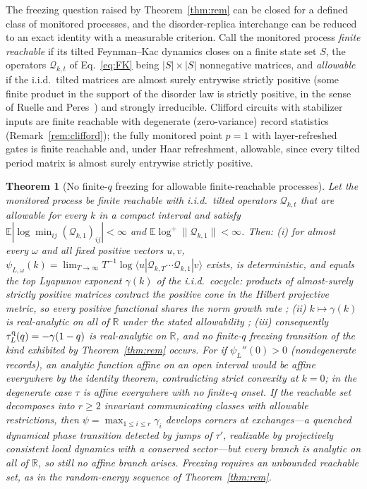 \documentclass[aps,prx,reprint,superscriptaddress,nobibnotes,longbibliography]{revtex4-2}
\newtheorem{theorem}{Theorem}
\theoremstyle{remark}
\newcommand{\E}{\mathbb E}
\begin{document}
The freezing question raised by Theorem~\ref{thm:rem} can be closed for a
defined class of monitored processes, and the disorder-replica interchange
can be reduced to an exact identity with a measurable criterion.  Call the
monitored process \emph{finite reachable} if its tilted Feynman--Kac
dynamics closes on a finite state set $S$, the operators
$\mathcal Q_{k,t}$ of Eq.~\eqref{eq:FK} being $|S|\times|S|$ nonnegative
matrices, and \emph{allowable} if the i.i.d.\ tilted matrices are almost
surely entrywise strictly positive (some finite product in the support of
the disorder law is strictly positive, in the sense of Ruelle and
Peres~\cite{Ruelle1979,Peres1992}) and strongly irreducible.  Clifford
circuits with stabilizer inputs are finite reachable with degenerate
(zero-variance) record statistics (Remark~\ref{rem:clifford}); the fully
monitored point $p=1$ with layer-refreshed gates is finite reachable and,
under Haar refreshment, allowable, since every tilted period matrix is
almost surely entrywise strictly positive.

\begin{theorem}[No finite-$q$ freezing for allowable finite-reachable processes]
\label{thm:nofreeze}
Let the monitored process be finite reachable with i.i.d.\ tilted
operators $\mathcal Q_{k,t}$ that are allowable for every $k$ in a compact
interval and satisfy $\E|\log\min_{ij}(\mathcal Q_{k,1})_{ij}|<\infty$ and
$\E\log^+\|\mathcal Q_{k,1}\|<\infty$.  Then:
(i) for almost every $\omega$ and all fixed positive vectors $u,v$,
$\psi_{L,\omega}(k)=\lim_{T\to\infty}T^{-1}\log\langle
u|\mathcal Q_{k,T}\cdots\mathcal Q_{k,1}|v\rangle$ exists, is
deterministic, and equals the top Lyapunov exponent $\gamma(k)$ of the
i.i.d.\ cocycle: products of almost-surely strictly positive matrices
contract the positive cone in the Hilbert projective metric, so every
positive functional shares the norm growth rate
\cite{FurstenbergKesten1960};
(ii) $k\mapsto\gamma(k)$ is real-analytic on all of $\mathbb R$ under the
stated allowability \cite{LePage1974,Ruelle1979,Peres1992};
(iii) consequently $\tau_L^{\rm q}(q)=-\gamma(1-q)$ is real-analytic on
$\mathbb R$, and no finite-$q$ freezing transition of the kind exhibited
by Theorem~\ref{thm:rem} occurs.  For if $\psi_L''(0)>0$ (nondegenerate
records), an analytic function affine on an open interval would be affine
everywhere by the identity theorem, contradicting strict convexity at
$k=0$; in the degenerate case $\tau$ is affine everywhere with no
finite-$q$ onset.  If the reachable set decomposes into $r\ge2$ invariant
communicating classes with allowable restrictions, then
$\psi=\max_{1\le i\le r}\gamma_i$ develops corners at exchanges---a
quenched dynamical phase transition detected by jumps of $\tau'$, realizable
by projectively consistent local dynamics with a conserved sector---but
every branch is analytic on all of $\mathbb R$, so still no affine branch
arises.  Freezing requires an \emph{unbounded} reachable set, as in the
random-energy sequence of Theorem~\ref{thm:rem}.
\end{theorem}
\end{document}
